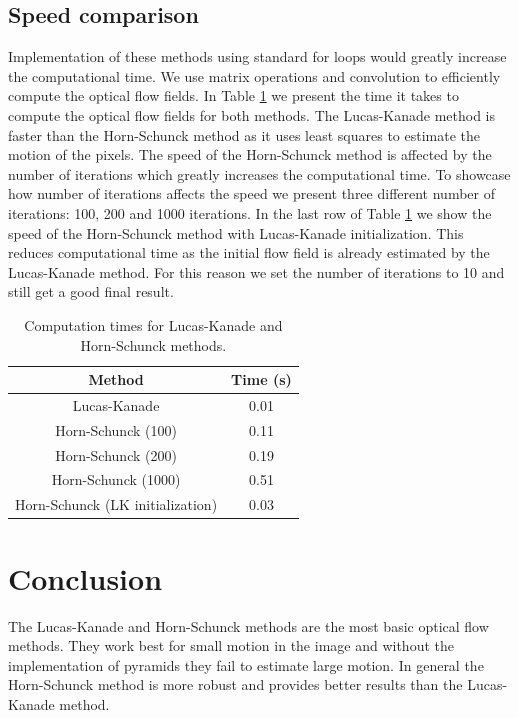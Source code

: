 \documentclass[9pt]{IEEEtran}
\begin{document}
\subsection*{Speed comparison}
Implementation of these methods using standard for loops would greatly increase the computational time.
We use matrix operations and convolution to efficiently compute the optical flow fields.
In Table \ref{speed} we present the time it takes to compute the optical flow fields for both methods.
The Lucas-Kanade method is faster than the Horn-Schunck method as it uses least squares to estimate the motion of the pixels.
The speed of the Horn-Schunck method is affected by the number of iterations which greatly increases the computational time.
To showcase how number of iterations affects the speed we present three different number of iterations: 100, 200 and 1000 iterations.
In the last row of Table \ref{speed} we show the speed of the Horn-Schunck method with Lucas-Kanade initialization.
This reduces computational time as the initial flow field is already estimated by the Lucas-Kanade method.
For this reason we set the number of iterations to 10 and still get a good final result.
\begin{table}[H]
    \centering
    \begin{tabular}{|c|c|}
        \hline
        Method & Time (s) \\
        \hline
        Lucas-Kanade & 0.01 \\
        Horn-Schunck (100) & 0.11 \\
        Horn-Schunck (200) & 0.19 \\
        Horn-Schunck (1000) & 0.51 \\
        Horn-Schunck (LK initialization) & 0.03 \\
        \hline
    \end{tabular}
    \caption{Computation times for Lucas-Kanade and Horn-Schunck methods.}
    \label{speed}

\end{table}

\section{Conclusion}
The Lucas-Kanade and Horn-Schunck methods are the most basic optical flow methods.
They work best for small motion in the image and without the implementation of pyramids they fail to estimate large motion.
In general the Horn-Schunck method is more robust and provides better results than the Lucas-Kanade method.



\end{document}
